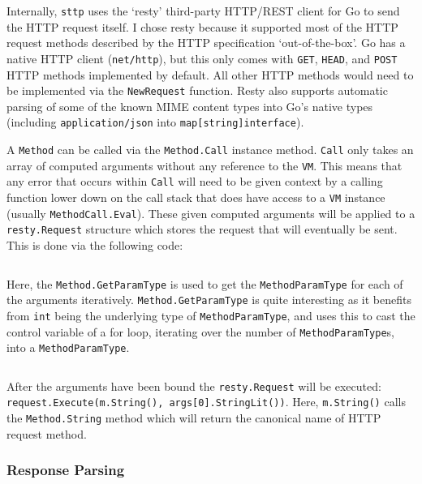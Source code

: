 Internally, \verb|sttp| uses the `resty' third-party HTTP/REST client for Go\textsuperscript{\cite{resty}} to send the HTTP request itself. I chose resty because it supported most of the HTTP request methods described by the HTTP specification `out-of-the-box'. Go has a native HTTP client (\verb|net/http|), but this only comes with \verb|GET|, \verb|HEAD|, and \verb|POST| HTTP methods implemented by default. All other HTTP methods would need to be implemented via the \verb|NewRequest| function. Resty also supports automatic parsing of some of the known MIME content types into Go's native types (including \verb|application/json| into \texttt{map[string]interface{}}).

A \verb|Method| can be called via the \verb|Method.Call| instance method. \verb|Call| only takes an array of computed arguments without any reference to the \verb|VM|. This means that any error that occurs within \verb|Call| will need to be given context by a calling function lower down on the call stack that does have access to a \verb|VM| instance (usually \verb|MethodCall.Eval|). These given computed arguments will be applied to a \verb|resty.Request| structure which stores the request that will eventually be sent. This is done via the following code:

\inputminted[firstline=169, lastline=182, autogobble, breaklines, tabsize=4]{go}{../../src/eval/methods.go}

Here, the \verb|Method.GetParamType| is used to get the \verb|MethodParamType| for each of the arguments iteratively. \verb|Method.GetParamType| is quite interesting as it benefits from \texttt{int} being the underlying type of \verb|MethodParamType|, and uses this to cast the control variable of a for loop, iterating over the number of \verb|MethodParamType|s, into a \verb|MethodParamType|.

\inputminted[firstline=151, lastline=164, autogobble, breaklines, tabsize=4]{go}{../../src/eval/methods.go}

After the arguments have been bound the \verb|resty.Request| will be executed: \texttt{request.Execute(m.String(), args[0].StringLit())}. Here, \verb|m.String()| calls the \verb|Method.String| method which will return the canonical name of HTTP request method.

\subsubsection{Response Parsing}

